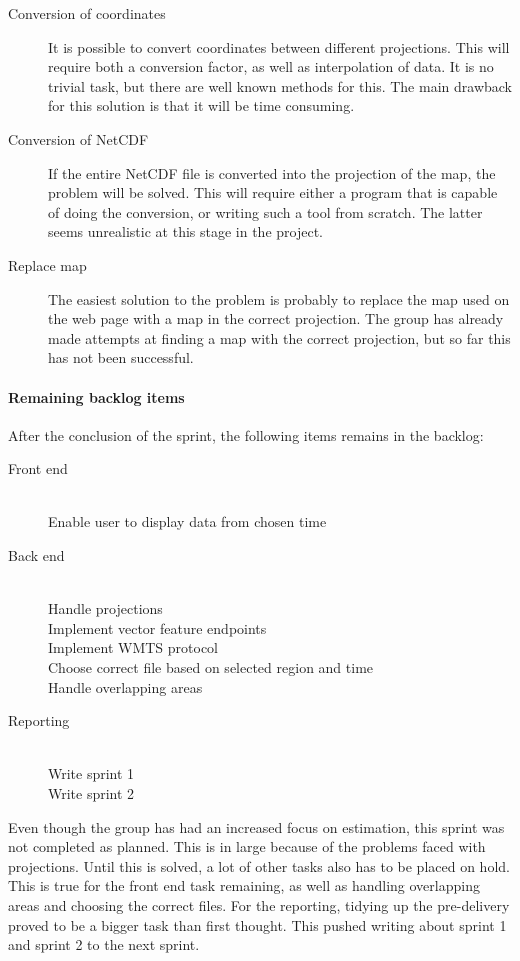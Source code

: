 \documentclass[11pt,a4paper,titlepage,oneside]{report}
\begin{document}
\begin{description}
\item[Conversion of coordinates] It is possible to convert coordinates between different projections. This will require both a conversion factor, as well as interpolation of data. It is no trivial task, but there are well known methods for this. The main drawback for this solution is that it will be time consuming. 
\item[Conversion of NetCDF] If the entire NetCDF file is converted into the projection of the map, the problem will be solved. This will require either a program that is capable of doing the conversion, or writing such a tool from scratch. The latter seems unrealistic at this stage in the project.
\item[Replace map] The easiest solution to the problem is probably to replace the map used on the web page with a map in the correct projection. The group has already made attempts at finding a map with the correct projection, but so far this has not been successful.
\end{description}

\paragraph{Remaining backlog items}
After the conclusion of the sprint, the following items remains in the backlog:
\begin{description}
	\item[Front end] \hfill \\
	Enable user to display data from chosen time
	\item[Back end] \hfill \\
	Handle projections \hfill \\
	Implement vector feature endpoints \hfill \\
	Implement WMTS protocol \hfill \\
	Choose correct file based on selected region and time \hfill \\
	Handle overlapping areas 
	\item[Reporting] \hfill \\
	Write sprint 1 \hfill \\
	Write sprint 2
\end{description}

Even though the group has had an increased focus on estimation, this sprint was not completed as planned. This is in large because of the problems faced with projections. Until this is solved, a lot of other tasks also has to be placed on hold. This is true for the front end task remaining, as well as handling overlapping areas and choosing the correct files. For the reporting, tidying up the pre-delivery proved to be a bigger task than first thought. This pushed writing about sprint 1 and sprint 2 to the next sprint.  
\end{document}
